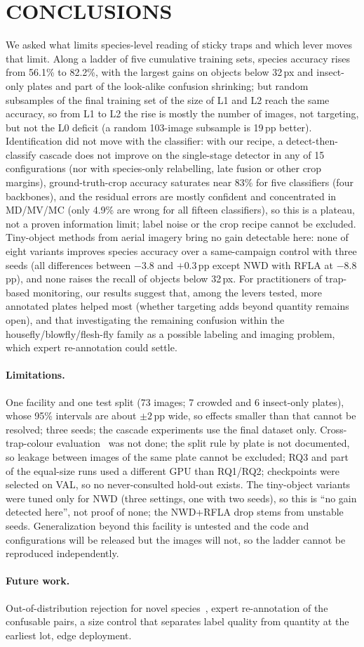 \section{\uppercase{Conclusions}}
\label{sec:conclusion}

We asked what limits species-level reading of sticky traps and which lever moves that limit. Along a ladder of five cumulative training sets, species accuracy rises from 56.1\% to 82.2\%, with the largest gains on objects below 32\,px and insect-only plates and part of the look-alike confusion shrinking; but random subsamples of the final training set of the size of L1 and L2 reach the same accuracy, so from L1 to L2 the rise is mostly the number of images, not targeting, but not the L0 deficit (a random 103-image subsample is 19\,pp better). Identification did not move with the classifier: with our recipe, a detect-then-classify cascade does not improve on the single-stage detector in any of 15 configurations (nor with species-only relabelling, late fusion or other crop margins), ground-truth-crop accuracy saturates near 83\% for five classifiers (four backbones), and the residual errors are mostly confident and concentrated in MD/MV/MC (only 4.9\% are wrong for all fifteen classifiers), so this is a plateau, not a proven information limit; label noise or the crop recipe cannot be excluded. Tiny-object methods from aerial imagery bring no gain detectable here: none of eight variants improves species accuracy over a same-campaign control with three seeds (all differences between $-3.8$ and $+0.3$\,pp except NWD with RFLA at $-8.8$\,pp), and none raises the recall of objects below 32\,px. For practitioners of trap-based monitoring, our results suggest that, among the levers tested, more annotated plates helped most (whether targeting adds beyond quantity remains open), and that investigating the remaining confusion within the housefly/blowfly/flesh-fly family as a possible labeling and imaging problem, which expert re-annotation could settle.

\paragraph{Limitations.} One facility and one test split (73 images; 7 crowded and 6 insect-only plates), whose 95\% intervals are about $\pm2$\,pp wide, so effects smaller than that cannot be resolved; three seeds; the cascade experiments use the final dataset only. Cross-trap-colour evaluation~\cite{ong2025} was not done; the split rule by plate is not documented, so leakage between images of the same plate cannot be excluded; RQ3 and part of the equal-size runs used a different GPU than RQ1/RQ2; checkpoints were selected on VAL, so no never-consulted hold-out exists. The tiny-object variants were tuned only for NWD (three settings, one with two seeds), so this is ``no gain detected here'', not proof of none; the NWD+RFLA drop stems from unstable seeds. Generalization beyond this facility is untested and the code and configurations will be released but the images will not, so the ladder cannot be reproduced independently.

\paragraph{Future work.} Out-of-distribution rejection for novel species~\cite{opensect2025}, expert re-annotation of the confusable pairs, a size control that separates label quality from quantity at the earliest lot, edge deployment.
